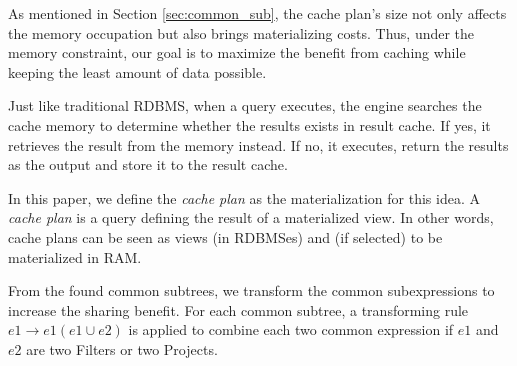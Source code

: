 As mentioned in Section \ref{sec:common_sub}, the cache plan's size not only affects the memory occupation but also brings materializing costs. Thus, under the memory constraint, our goal is to maximize the benefit from caching while keeping the least amount of data possible.

Just like traditional RDBMS, when a query executes, the engine searches the cache memory to determine whether the results exists in result cache. If yes, it retrieves the result from the memory instead. If no, it executes, return the results as the output and store it to the result cache.

In this paper, we define the \emph{cache plan} as the materialization for this idea. A \emph{cache plan} is a query defining the result of a materialized view. In other words, cache plans can be seen as views (in RDBMSes) and (if selected) to be materialized in RAM. 

From the found common subtrees, we transform the common subexpressions to increase the sharing benefit. For each common subtree, a transforming rule $e1 \rightarrow e1(e1 \cup e2)$ is applied to combine each two common expression if $e1$ and $e2$ are two Filters or two Projects.